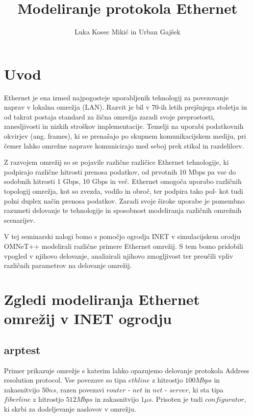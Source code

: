 \graphicspath{{Skupina05/img/}}

\title{Modeliranje protokola Ethernet}

\author{Luka Kosec Mikić in Urban Gajšek}

\maketitle

\section{Uvod}

Ethernet je ena izmed najpogosteje uporabljenih tehnologij za povezovanje naprav v
lokalna omrežja (LAN). Razvit je bil v 70-ih letih prejšnjega stoletja in od takrat
postaja standard za žična omrežja zaradi svoje preprostosti, zanesljivosti in nizkih
stroškov implementacije. Temelji na uporabi podatkovnih okvirjev (ang. frames),
ki se prenašajo po skupnem komunikacijskem mediju, pri čemer lahko omrežne naprave
komunicirajo med seboj prek stikal in razdelilcev.

Z razvojem omrežij so se pojavile različne različice Ethernet tehnologije,
ki podpirajo različne hitrosti prenosa podatkov, od prvotnih 10 Mbps pa vse do
sodobnih hitrosti 1 Gbps, 10 Gbps in več. Ethernet omogoča uporabo različnih topologij
omrežja, kot so zvezda, vodilo in obroč, ter podpira tako pol- kot tudi polni duplex
način prenosa podatkov. Zaradi svoje široke uporabe je pomembno razumeti delovanje te
tehnologije in sposobnost modeliranja različnih omrežnih scenarijev.

V tej seminarski nalogi bomo s pomočjo ogrodja INET v simulacijskem orodju OMNeT++
modelirali različne primere Ethernet omrežij. S tem bomo pridobili vpogled v njihovo delovanje,
analizirali njihovo zmogljivost ter preučili vpliv različnih parametrov
na delovanje omrežij.

\newpage

\section{Zgledi modeliranja Ethernet omrežij v INET ogrodju}

\subsection{arptest}
Primer prikazuje omrežje s katerim lahko opazujemo delovanje protokola Address resolution protocol. Vse povezave so tipa $ethline$ z hitrostjo $100Mbps$ in zakasnitvijo $50ns$, razen povezavi $router$ - $net$ in $net$ - $server$, ki sta tipa $fiberline$ z hitrostjo $512Mbps$ in zakasnitvijo $1\mu s$. Prisoten je tudi $configurator$, ki skrbi za dodeljevanje naslovov v omrežju.

